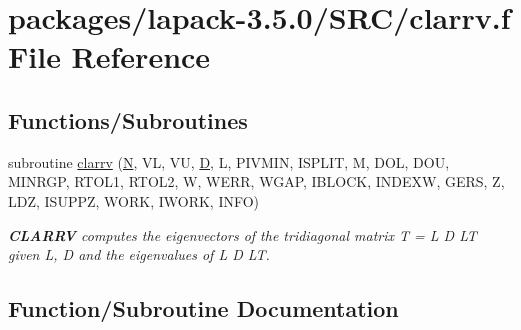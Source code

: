 \hypertarget{clarrv_8f}{}\section{packages/lapack-\/3.5.0/\+S\+R\+C/clarrv.f File Reference}
\label{clarrv_8f}
\subsection*{Functions/\+Subroutines}
\begin{DoxyCompactItemize}
\item 
subroutine \hyperlink{clarrv_8f_afca688d32e9f8491d559ee79e871b01b}{clarrv} (\hyperlink{polmisc_8c_a0240ac851181b84ac374872dc5434ee4}{N}, V\+L, V\+U, \hyperlink{odrpack_8h_a7dae6ea403d00f3687f24a874e67d139}{D}, L, P\+I\+V\+M\+I\+N, I\+S\+P\+L\+I\+T, M, D\+O\+L, D\+O\+U, M\+I\+N\+R\+G\+P, R\+T\+O\+L1, R\+T\+O\+L2, W, W\+E\+R\+R, W\+G\+A\+P, I\+B\+L\+O\+C\+K, I\+N\+D\+E\+X\+W, G\+E\+R\+S, Z, L\+D\+Z, I\+S\+U\+P\+P\+Z, W\+O\+R\+K, I\+W\+O\+R\+K, I\+N\+F\+O)
\begin{DoxyCompactList}\small\item\em {\bfseries C\+L\+A\+R\+R\+V} computes the eigenvectors of the tridiagonal matrix T = L D L\+T given L, D and the eigenvalues of L D L\+T. \end{DoxyCompactList}\end{DoxyCompactItemize}


\subsection{Function/\+Subroutine Documentation}
\hypertarget{clarrv_8f_afca688d32e9f8491d559ee79e871b01b}{}
